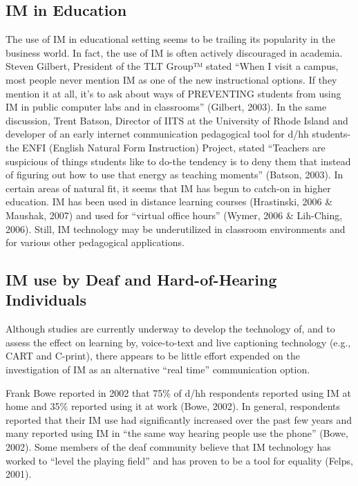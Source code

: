 \documentclass[11.5pt]{sig-alternate} %
\begin{document}
\begin{large}
\subsection*{IM in Education}

The use of IM in educational setting seems to be trailing its popularity in the business world. In fact, the use of IM is often actively discouraged in academia. Steven Gilbert, President of the TLT Group™ stated ``When I visit a campus, most people never mention IM as one of the new instructional options. If they mention it at all, it's to ask about ways of PREVENTING students from using IM in public computer labs and in classrooms'' (Gilbert, 2003). In the same discussion, Trent Batson, Director of IITS at the University of Rhode Island and developer of an early internet communication pedagogical tool for d/hh students-the ENFI (English Natural Form Instruction) Project, stated ``Teachers are suspicious of things students like to do-the tendency is to deny them that instead of figuring out how to use that energy as teaching moments'' (Batson, 2003). In certain areas of natural fit, it seems that IM has begun to catch-on in higher education. IM has been used in distance learning courses (Hrastinski, 2006 \& Maushak, 2007) and used for “virtual office hours” (Wymer, 2006 \& Lih-Ching, 2006). Still, IM technology may be underutilized in classroom environments and for various other pedagogical applications. 

\subsection*{IM use by Deaf and Hard-of-Hearing Individuals}

Although studies are currently underway to develop the technology of, and to assess the effect on learning by, voice-to-text and live captioning technology (e.g., CART and C-print), there appears to be little effort expended on the investigation of IM as an alternative ``real time'' communication option. 

Frank Bowe reported in 2002 that 75\% of d/hh respondents reported using IM at home and 35\% reported using it at work (Bowe, 2002). In general, respondents reported that their IM use had significantly increased over the past few years and many reported using IM in “the same way hearing people use the phone” (Bowe, 2002). Some members of the deaf community believe that IM technology has worked to “level the playing field” and has proven to be a tool for equality (Felps, 2001). 


\end{large}
\end{document}
